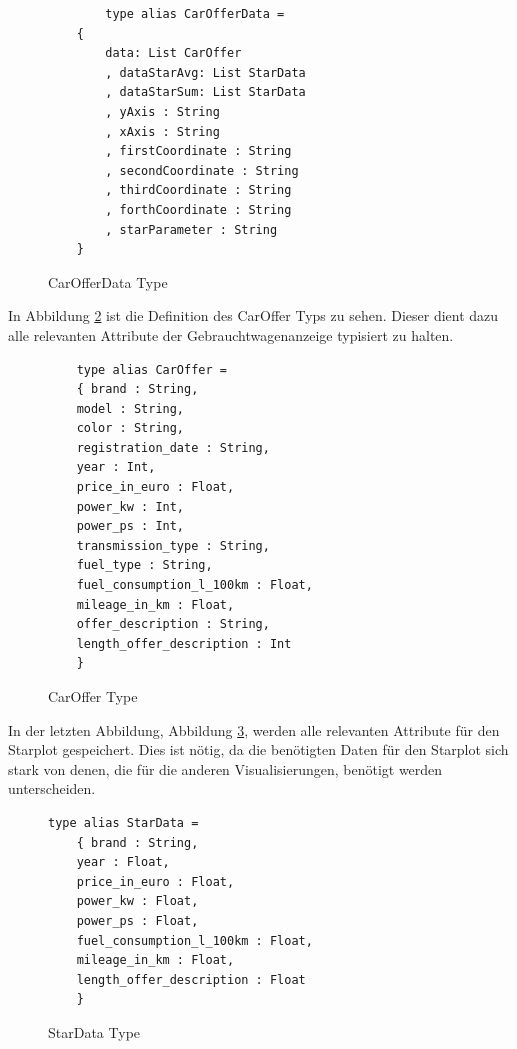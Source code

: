 \begin{figure}[h]
    \centering
    \begin{mdframed}[backgroundcolor=black!10]
    \begin{verbatim}
        type alias CarOfferData =
    {
        data: List CarOffer
        , dataStarAvg: List StarData
        , dataStarSum: List StarData
        , yAxis : String
        , xAxis : String
        , firstCoordinate : String
        , secondCoordinate : String
        , thirdCoordinate : String
        , forthCoordinate : String
        , starParameter : String
    }
    \end{verbatim}
\end{mdframed}
\caption{CarOfferData Type}
\label{carofferdata}
\end{figure}

In Abbildung \ref{fig:caroffer} ist die Definition des CarOffer Typs zu sehen. Dieser dient dazu alle relevanten Attribute der Gebrauchtwagenanzeige typisiert zu halten. \\
\begin{figure}[H]
    \centering
    \begin{mdframed}[backgroundcolor=black!10]
    \begin{verbatim}
    type alias CarOffer =
    { brand : String,
    model : String,
    color : String,
    registration_date : String,
    year : Int,
    price_in_euro : Float,
    power_kw : Int,
    power_ps : Int,
    transmission_type : String,
    fuel_type : String,
    fuel_consumption_l_100km : Float,
    mileage_in_km : Float,
    offer_description : String,
    length_offer_description : Int
    }

    \end{verbatim}
\end{mdframed}
\caption{CarOffer Type}
\label{fig:caroffer}
\end{figure}

In der letzten Abbildung, Abbildung \ref{fig:stardatatype}, werden alle relevanten Attribute für den Starplot gespeichert. Dies ist nötig, da die benötigten Daten für den Starplot sich stark von denen, die für die anderen Visualisierungen, benötigt werden unterscheiden. \\
\begin{figure}[H]
    \centering
    \begin{mdframed}[backgroundcolor=black!10]
    \begin{verbatim}
type alias StarData =
    { brand : String,
    year : Float,
    price_in_euro : Float,
    power_kw : Float,
    power_ps : Float,
    fuel_consumption_l_100km : Float,
    mileage_in_km : Float,
    length_offer_description : Float
    }

    \end{verbatim}
\end{mdframed}
\caption{StarData Type}
\label{fig:stardatatype}
\end{figure}

